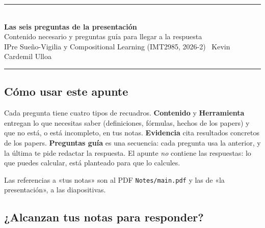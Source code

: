\documentclass[11pt,a4paper]{article}
\begin{document}
\begin{center}
{\color{azul}\rule{\textwidth}{1.5pt}}\\[0.4cm]
{\LARGE\bfseries\color{azul} Las seis preguntas de la presentación}\\[0.2cm]
{\large Contenido necesario y preguntas guía para llegar a la respuesta}\\[0.2cm]
{\small IPre Sueño-Vigilia y Compositional Learning (IMT2985, 2026-2) \textbar\ Kevin Cardemil Ulloa}\\[0.2cm]
{\color{azul}\rule{\textwidth}{1.5pt}}
\end{center}

\subsection*{Cómo usar este apunte}

Cada pregunta tiene cuatro tipos de recuadros. \textbf{Contenido} y \textbf{Herramienta} entregan lo que necesitas saber (definiciones, fórmulas, hechos de los papers) y que no está, o está incompleto, en tus notas. \textbf{Evidencia} cita resultados concretos de los papers. \textbf{Preguntas guía} es una secuencia: cada pregunta usa la anterior, y la última te pide redactar la respuesta. El apunte \emph{no} contiene las respuestas: lo que puedes calcular, está planteado para que lo calcules.

Las referencias a «tus notas» son al PDF \texttt{Notes/main.pdf} y las de «la presentación», a las diapositivas.

\subsection*{¿Alcanzan tus notas para responder?}
\end{document}
